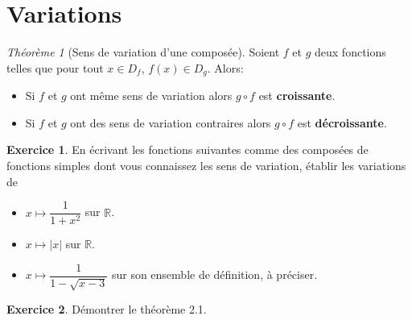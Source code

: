 \documentclass{article}
\theoremstyle{definition}
\newtheorem{exo}{Exercice}
\theoremstyle{remark}
\theoremstyle{theorem}
\newtheorem{thm}[mydef]{Théorème}
\newcommand{\RR}{\mathbb R}
\begin{document}
\section{Variations}

\begin{thm}[Sens de variation d'une composée]
Soient $f$ et $g$ deux fonctions telles que pour tout $x\in D_f$, $f(x)\in D_g$. Alors:\begin{itemize}
\item Si $f$ et $g$ ont même sens de variation alors $g\circ f$ est \textbf{croissante}.
\item Si $f$ et $g$ ont des sens de variation contraires alors $g\circ f$ est \textbf{décroissante}.
\end{itemize}
\end{thm}

\begin{exo}
En écrivant les fonctions suivantes comme des composées de fonctions simples dont vous connaissez les sens de variation, établir les variations de\begin{itemize}
\item $x\longmapsto \dfrac{1}{1+x^2}$ sur $\RR$.
\item $x\longmapsto |x|$ sur $\RR$.
\item $x\longmapsto \dfrac{1}{1-\sqrt{x-3}}$ sur son ensemble de définition, à préciser.
\end{itemize}
\end{exo}

\begin{exo}
Démontrer le théorème 2.1.
\end{exo}
\end{document}
